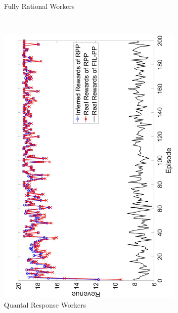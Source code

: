 \documentclass[letterpaper]{article} %
\begin{document}
\begin{figure}[htb]
\begin{subfigure}[t]{0.3\textwidth}
        \caption{\label{E1} Fully Rational Workers}
    \end{subfigure}%
    ~%
    \begin{subfigure}[t]{0.3\textwidth}
        \centering
        \includegraphics[width=\textwidth]{image/2}
        \caption{\label{E2}  Quantal Response Workers}
    \end{subfigure}
    ~%
    \begin{subfigure}[t]{0.3\textwidth}
        \centering

\end{subfigure}
\end{figure}
\end{document}
